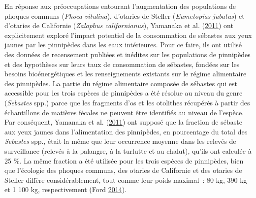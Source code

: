 \documentclass[11pt]{book}
\begin{document}
\label{app:pinniped-predation}

En réponse aux préoccupations entourant l'augmentation des populations de phoques communs (\emph{Phoca vitulina}), d'otaries de Steller (\emph{Eumetopias jubatus}) et d'otaries de Californie (\emph{Zalophus californianus}), Yamanaka et al. (\protect\hyperlink{ref-yamanaka2011}{2011}) ont explicitement exploré l'impact potentiel de la consommation de sébastes aux yeux jaunes par les pinnipèdes dans les eaux intérieures. Pour ce faire, ils ont utilisé des données de recensement publiées et inédites sur les populations de pinnipèdes et des hypothèses sur leurs taux de consommation de sébastes, fondées sur les besoins bioénergétiques et les renseignements existants sur le régime alimentaire des pinnipèdes. La partie du régime alimentaire composée de sébastes qui est accessible pour les trois espèces de pinnipèdes a été résolue au niveau du genre (\emph{Sebastes} spp.) parce que les fragments d'os et les otolithes récupérés à partir des échantillons de matières fécales ne peuvent être identifiés au niveau de l'espèce. Par conséquent, Yamanaka et al. (\protect\hyperlink{ref-yamanaka2011}{2011}) ont supposé que la fraction de sébaste aux yeux jaunes dans l'alimentation des pinnipèdes, en pourcentage du total des \emph{Sebastes} spp., était la même que leur occurrence moyenne dans les relevés de surveillance (relevés à la palangre, à la turlutte et au chalut), qu'ils ont calculée à 25 \%. La même fraction a été utilisée pour les trois espèces de pinnipèdes, bien que l'écologie des phoques communs, des otaries de Californie et des otaries de Steller diffère considérablement, tout comme leur poids maximal~: 80 kg, 390 kg et 1 100 kg, respectivement (Ford \protect\hyperlink{ref-ford2014}{2014}).
\end{document}
